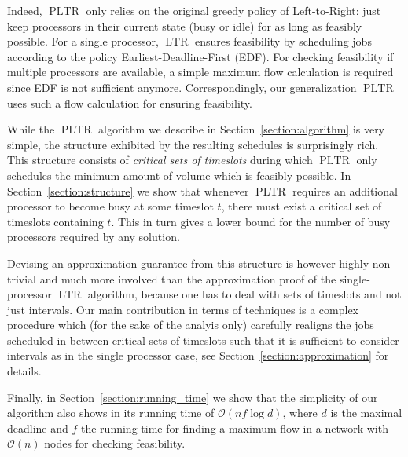 \documentclass[a4paper]{article}
\DeclareMathOperator{\PLTR}{PLTR}
\DeclareMathOperator{\LTR}{LTR}
\begin{document}
Indeed, $\PLTR$ only relies on the original greedy policy of Left-to-Right: just keep processors in their current state (busy or idle) for as long as feasibly possible.
For a single processor, $\LTR$ ensures feasibility by scheduling jobs according to the policy Earliest-Deadline-First (EDF).
For checking feasibility if multiple processors are available, a simple maximum flow calculation is required since EDF is not sufficient anymore.
Correspondingly, our generalization $\PLTR$ uses such a flow calculation for ensuring feasibility.

While the $\PLTR$ algorithm we describe in Section~\ref{section:algorithm} is very simple, the structure exhibited by the resulting schedules is surprisingly rich.
This structure consists of \textit{critical sets of timeslots} during which $\PLTR$ only schedules the minimum amount of volume which is feasibly possible.
In Section~\ref{section:structure} we show that whenever $\PLTR$ requires an additional processor to become busy at some timeslot $t$, there must exist a critical set of timeslots containing $t$.
This in turn gives a lower bound for the number of busy processors required by any solution.

Devising an approximation guarantee from this structure is however highly non-trivial and much more involved than the approximation proof of the single-processor $\LTR$ algorithm, because one has to deal with sets of timeslots and not just intervals.
Our main contribution in terms of techniques is a complex procedure which (for the sake of the analyis only) carefully realigns the jobs scheduled in between critical sets of timeslots such that it is sufficient to consider intervals as in the single processor case, see Section~\ref{section:approximation} for details.

Finally, in Section~\ref{section:running_time} we show that the simplicity of our algorithm also shows in its running time of $\mathcal{O}(n f \log d)$, where $d$ is the maximal deadline and $f$ the running time for finding a maximum flow in a network with $\mathcal{O}(n)$ nodes for checking feasibility.

\end{document}
